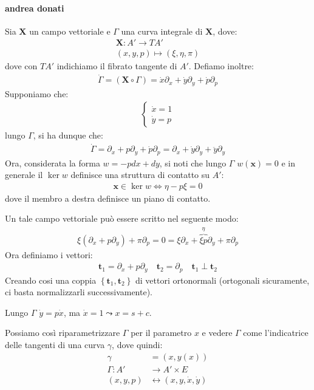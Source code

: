 \paragraph{andrea donati}
Sia $\bm{X}$ un campo vettoriale e $\Gamma$ una curva integrale di $\bm{X}$, dove:
\begin{align*}
    \bm{X}\colon A' \to TA'\\
    (x,y,p)\mapsto (\xi, \eta, \pi)
\end{align*}
dove con $TA'$ indichiamo il fibrato tangente di $A'$.
Defiamo inoltre:
\begin{align*}
    \dot{\Gamma}=(\bm{X}\circ \Gamma)=\dot{x}\partial_x+\dot{y}\partial_y+\dot{p}\partial_p
\end{align*}
Supponiamo che:
\begin{align*}
    \begin{cases*}
        \dot{x}=1\\
        \dot{y}=p
    \end{cases*}
\end{align*}
lungo $\Gamma$, si ha dunque che:
\begin{align*}
    \dot{\Gamma}=\partial_x+p\partial_y+\dot{p}\partial_p=\partial_x+\dot{y}\partial_y+\ddot{y}\partial_y
\end{align*}
Ora, considerata la forma $w=-pdx+dy$, si noti che lungo $\Gamma$ $w(\bm{x})=0$ e in generale il $\ker w$ definisce una struttura di contatto su $A'$:
\begin{align*}
    \bm{x}\in \ker w \iff \eta-p\xi=0
\end{align*}
dove il membro a destra definisce un piano di contatto.

Un tale campo vettoriale può essere scritto nel seguente modo:
\begin{align*}
    \xi (\partial_x +p\partial_y)+\pi\partial_p = 0 = \xi\partial_x+\overbrace{\xi p}^{\eta}\partial_y+\pi\partial_p
\end{align*}
Ora definiamo i vettori:
\begin{align*}
    \bm{t}_1=\partial_x+p\partial_y \quad \bm{t}_2=\partial_p \quad \bm{t}_1\perp\bm{t}_2
\end{align*}
Creando cosi una coppia $\left\{\bm{t}_1,\bm{t}_2\right\}$ di vettori ortonormali (ortogonali sicuramente, ci basta normalizzarli successivamente).

Lungo $\Gamma$ $\dot{y}=p\dot{x}$, ma $\dot{x}=1\leadsto x=s+c$.

Possiamo così riparametrizzare $\Gamma$ per il parametro $x$ e vedere $\Gamma$ come l'indicatrice delle tangenti di una curva $\gamma$, dove quindi:
\begin{align*}
    \gamma&=(x,y(x)) \\
    \Gamma\colon A'&\longrightarrow A'\times E \\
     (x,y,p)&\longleftrightarrow (x,y,\dot{x},\dot{y})
\end{align*}

